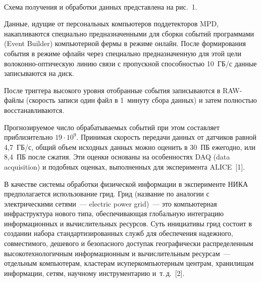 \begin{figure} %
\vspace*{9pt}
 \begin{center}
 \mbox{%
 \epsfxsize=157.686mm
 }
 \end{center}
 \vspace*{-6pt}
\vspace*{6pt}
\end{figure}

\begin{multicols}{2}

   Схема получения и обработки данных пред\-став\-ле\-на на рис.~1. 
   
   Данные, 
идущие от персональных компьютеров поддетекторов MPD, накапливаются 
специально предназначенными для сборки событий программами (Event 
Builder) компьютерной фермы в режиме онлайн. После формирования события 
в режиме офлайн через специально предназначенную для этой цели 
во\-ло\-кон\-но-оп\-ти\-че\-скую линию связи с пропускной способностью 10~ГБ/с данные 
записываются на диск.
   
   После триггера высокого уровня отобранные события записываются в 
   RAW-фай\-лы (скорость записи один файл в 1~минуту сбора данных) и затем 
полностью восстанавливаются. 
   
   Прогнозируемое число обрабатываемых событий при этом составляет 
приблизительно $19\cdot 10^9$. Принимая скорость передачи данных от 
датчиков равной 4,7~ГБ/с, общий объем исходных данных можно оценить в 
30~ПБ ежегодно, или 8,4~ПБ после сжатия. Эти оценки основаны на 
особенностях DAQ (data acquisition) и подобных оценках, выполненных для эксперимента 
ALICE~[1].
   


   В качестве системы обработки физической информации в эксперименте 
НИКА предполагается использование грид. Грид (название по аналогии с 
электрическими сетями~--- electric power grid)~--- это компьютерная 
инфраструктура нового типа, обеспечивающая глобальную интеграцию 
информационных и вычислительных ресурсов. Суть инициативы грид состоит 
в создании набора стандартизированных служб для обеспечения надежного, 
совместимого, дешевого и безопасного доступа\linebreak к географически 
распределенным высокотехно\-логичным информационным и вычислительным 
ресурсам~--- отдельным компьютерам, кластерам и\linebreak суперкомпьютерным 
центрам, хранилищам информации, сетям, научному инструментарию 
и~т.\,д.~[2]. 


\end{multicols}
